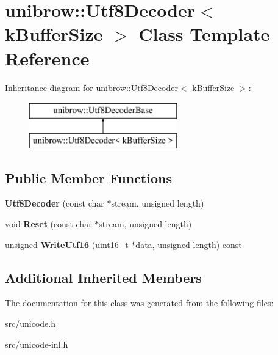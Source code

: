 \hypertarget{classunibrow_1_1_utf8_decoder}{}\section{unibrow\+:\+:Utf8\+Decoder$<$ k\+Buffer\+Size $>$ Class Template Reference}
\label{classunibrow_1_1_utf8_decoder}
Inheritance diagram for unibrow\+:\+:Utf8\+Decoder$<$ k\+Buffer\+Size $>$\+:\begin{figure}[H]
\begin{center}
\leavevmode
\includegraphics[height=2.000000cm]{classunibrow_1_1_utf8_decoder}
\end{center}
\end{figure}
\subsection*{Public Member Functions}
\begin{DoxyCompactItemize}
\item 
\hypertarget{classunibrow_1_1_utf8_decoder_a439e007c7c2b2c3e2209071bc8ebbf04}{}{\bfseries Utf8\+Decoder} (const char $\ast$stream, unsigned length)\label{classunibrow_1_1_utf8_decoder_a439e007c7c2b2c3e2209071bc8ebbf04}

\item 
\hypertarget{classunibrow_1_1_utf8_decoder_a2231d2aa6e338c257b0d863fcc97abfc}{}void {\bfseries Reset} (const char $\ast$stream, unsigned length)\label{classunibrow_1_1_utf8_decoder_a2231d2aa6e338c257b0d863fcc97abfc}

\item 
\hypertarget{classunibrow_1_1_utf8_decoder_a6d4e4d19a11f68862385ec1c23d0cff8}{}unsigned {\bfseries Write\+Utf16} (uint16\+\_\+t $\ast$data, unsigned length) const \label{classunibrow_1_1_utf8_decoder_a6d4e4d19a11f68862385ec1c23d0cff8}

\end{DoxyCompactItemize}
\subsection*{Additional Inherited Members}


The documentation for this class was generated from the following files\+:\begin{DoxyCompactItemize}
\item 
src/\hyperlink{unicode_8h}{unicode.\+h}\item 
src/unicode-\/inl.\+h\end{DoxyCompactItemize}
